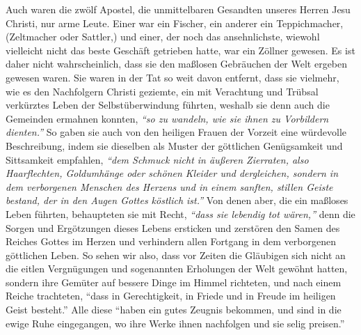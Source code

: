 Auch waren die zwölf Apostel, die unmittelbaren
Gesandten unseres Herren Jesu
Christi, nur arme Leute. Einer war ein Fischer, ein
anderer ein
Teppichmacher,
(Zeltmacher oder Sattler,) und einer, der noch das ansehnlichste, wiewohl
vielleicht nicht das beste Geschäft getrieben hatte, war ein
Zöllner
gewesen.
Es ist daher nicht wahrscheinlich, dass sie den
maßlosen Gebräuchen der Welt ergeben
gewesen waren. Sie waren in der Tat so weit davon entfernt, dass sie vielmehr,
wie es den Nachfolgern Christi geziemte, ein mit Verachtung und Trübsal
verkürztes Leben der Selbstüberwindung führten,
weshalb sie denn auch die Gemeinden ermahnen konnten,
\textit{"`so zu wandeln, wie sie ihnen zu Vorbildern
dienten."'}
So gaben sie auch von den heiligen
Frauen der
Vorzeit
eine würdevolle Beschreibung, indem sie dieselben als Muster
der göttlichen Genügsamkeit und Sittsamkeit empfahlen,
\textit{"`dem Schmuck nicht in
äußeren Zierraten, also Haarflechten, Goldumhänge oder schönen Kleider und
dergleichen,
sondern in dem verborgenen Menschen des Herzens und in einem sanften, stillen
Geiste bestand, der in den Augen Gottes köstlich ist."'}
Von denen aber, die ein maßloses Leben
führten, behaupteten sie mit Recht,
\textit{"`dass sie lebendig tot wären,"'}
denn die Sorgen und
Ergötzungen dieses Lebens ersticken und zerstören den Samen des Reiches
Gottes im
Herzen und verhindern allen Fortgang in dem verborgenen göttlichen
Leben.
So sehen wir also, dass vor Zeiten die Gläubigen sich
nicht an die eitlen Vergnügungen und sogenannten Erholungen der Welt gewöhnt
hatten, sondern ihre Gemüter auf bessere Dinge im Himmel
richteten, und nach
einem Reiche trachteten,
"`dass in Gerechtigkeit, in Friede und in Freude im
heiligen Geist besteht."'
Alle diese
"`haben ein gutes
Zeugnis bekommen, und sind in die ewige Ruhe eingegangen, wo ihre Werke ihnen
nachfolgen und sie selig preisen."'




